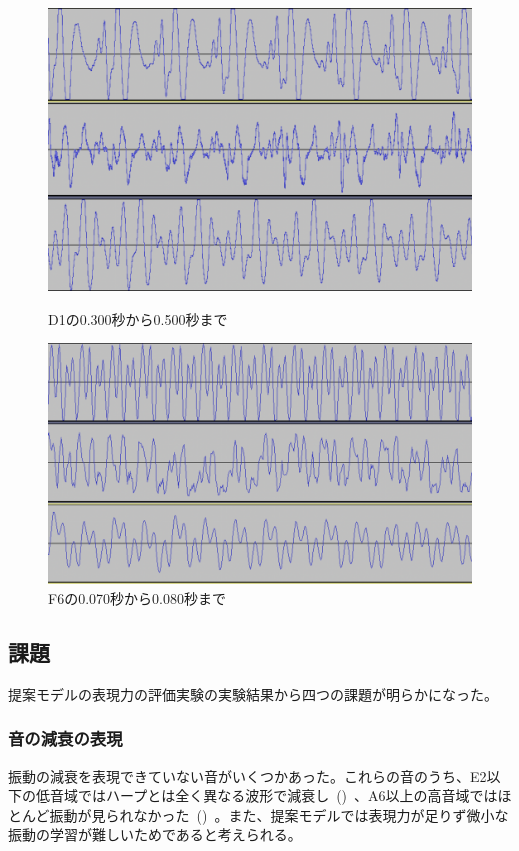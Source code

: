 \begin{figure}[b]
\centering
\begin{minipage}[b]{0.48\columnwidth}
\centering
\includegraphics[width=0.75\columnwidth]{figure/66_22_det/d1_0300_0500.png}
\caption[D1の音波]{D1の0.300秒から0.500秒まで}
\label{fig:66_22_bad1}
\end{minipage}
\begin{minipage}[b]{0.48\columnwidth}
\centering
\includegraphics[width=0.85\columnwidth]{figure/66_22_det/f6_0070_0080.png}
\caption[F6の音波]{F6の0.070秒から0.080秒まで}
\label{fig:66_22_bad2}
\end{minipage}
\end{figure}

\subsection{課題}

提案モデルの表現力の評価実験の実験結果から四つの課題が明らかになった。

\subsubsection{音の減衰の表現}

振動の減衰を表現できていない音がいくつかあった。これらの音のうち、E2以下の低音域ではハープとは全く異なる波形で減衰し~()~、A6以上の高音域ではほとんど振動が見られなかった~()~。また、提案モデルでは表現力が足りず微小な振動の学習が難しいためであると考えられる。

